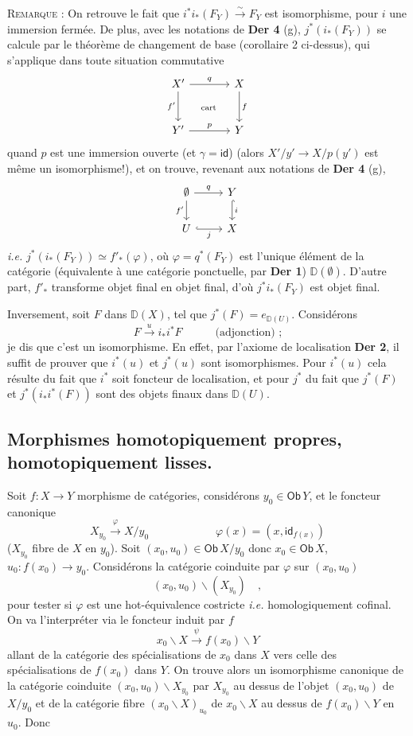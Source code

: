 \documentclass[11pt]{article}
\newcommand{\printedpage}[1]{\marginpar{\footnotesize p.~#1}}
\newcommand{\msp}[1]{\marginpar{\footnotesize [#1]}}
\newcommand{\Ob}{\mathsf{Ob}}
\newcommand{\DD}{\mathbb{D}}
\newcommand{\id}{\mathsf{id}}
\begin{document}
\noindent\textsc{Remarque} : On retrouve le fait que $i^*i_*(F_Y) \overset{\sim}{\to} F_Y$ est isomorphisme, pour $i$ une immersion fermée. De plus, avec les notations de \textbf{Der 4} (g), $j^*(i_*(F_Y))$ se calcule par le théorème de changement de base (corollaire 2 ci-dessus), qui s'applique dans toute situation commutative
\[
\begin{tikzcd}[row sep=large, column sep=large]
X' \arrow[r, "q"] \arrow[d, "f'"'] \arrow[dr, phantom, "\text{\scriptsize cart}"] & X \arrow[d, "f"] \\
Y' \arrow[r, "p"] & Y
\end{tikzcd}
\]
quand $p$ est une immersion ouverte (et $\gamma = \id$) (alors $X'/y' \to X/p(y')$ est même un isomorphisme!), et on trouve, revenant aux notations de \textbf{Der 4} (g),
\[
\begin{tikzcd}
\emptyset \arrow[r, "q"] \arrow[d, "f'"'] & Y \arrow[d, hook, "i"] \\
U \arrow[r, hook, "j"'] & X
\end{tikzcd}
\]
\textit{i.e.} $j^*(i_*(F_Y)) \simeq f'_*(\varphi)$, où $\varphi = q^*(F_Y)$ est l'unique élément de la catégorie (équivalente à une catégorie ponctuelle, par \textbf{Der 1}) $\DD(\emptyset)$. D'autre part, $f'_*$ transforme objet final en objet final, d'où $j^*i_*(F_Y)$ est objet final.

Inversement, soit $F$ dans $\DD(X)$, tel que $j^*(F) = e_{\DD(U)}$. Considérons
\[
F \xrightarrow{u} i_*i^*F \qquad\quad \text{(adjonction) ;}
\]
je dis que c'est un isomorphisme. En effet, par l'axiome \msp{page 52} de localisation \textbf{Der 2}, il suffit de prouver que $i^*(u)$ et $j^*(u)$ sont isomorphismes. Pour $i^*(u)$ cela résulte du fait que $i^*$ soit foncteur de localisation, et pour $j^*$ du fait que $j^*(F)$ et $j^*(i_*i^*(F))$ sont des objets finaux dans $\DD(U)$.

\printedpage{30}

\noindent\msp{page 53}

\subsection*{Morphismes homotopiquement propres, homotopiquement lisses.}

\noindent Soit $f : X \to Y$ morphisme de catégories, considérons $y_0 \in \Ob\, Y$, et le foncteur canonique
\[
X_{y_0} \xrightarrow{\varphi} X/y_0 \qquad\qquad\qquad \varphi(x) = (x, \id_{f(x)}) \tag*{(1)}
\]
($X_{y_0}$ fibre de $X$ en $y_0$). Soit $(x_0, u_0) \in \Ob\, X/y_0$ donc $x_0 \in \Ob\, X$, $u_0 : f(x_0) \to y_0$. Considérons la catégorie coinduite par $\varphi$ sur $(x_0, u_0)$
\[
(x_0, u_0)\backslash(X_{y_0}) \quad ,
\]
pour tester si $\varphi$ est une hot-équivalence costricte \textit{i.e.} homologiquement cofinal. On va l'interpréter via le foncteur induit par $f$
\[
x_0\backslash X \xrightarrow{\psi} f(x_0)\backslash Y
\]
allant de la catégorie des spécialisations de $x_0$ dans $X$ vers celle des spécialisations de $f(x_0)$ dans $Y$. On trouve alors un isomorphisme canonique de la catégorie coinduite $(x_0, u_0)\backslash X_{y_0}$ par $X_{y_0}$ au dessus de l'objet $(x_0, u_0)$ de $X/y_0$ et de la catégorie fibre $(x_0\backslash X)_{u_0}$ de $x_0\backslash X$ au dessus de $f(x_0)\backslash Y$ en $u_0$. Donc
\end{document}
